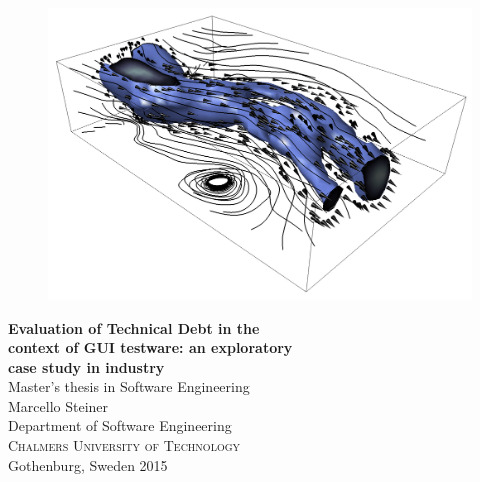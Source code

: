 
\begin{titlepage}
			
\addtolength{\voffset}{2cm}

\begin{figure}[h!]
\centering
\vspace{2cm}	%
\includegraphics[width=0.9\linewidth]{figure/Wind.png}
\end{figure}

\mbox{}
\vfill
\renewcommand{\familydefault}{\sfdefault} \normalfont %
\textbf{{\Huge 	Evaluation of Technical Debt in the  	\\[0.2cm] 
                context of GUI testware: an exploratory \\[0.2cm] 
				case study in industry}} 	\\[0.5cm]
Master's thesis in Software Engineering \\[0.5cm]

{\Large Marcello Steiner}\\[2.5cm]

Department of Software Engineering \\
\textsc{Chalmers University of Technology} \\
Gothenburg, Sweden 2015

\renewcommand{\familydefault}{\rmdefault} \normalfont %
\end{titlepage}


